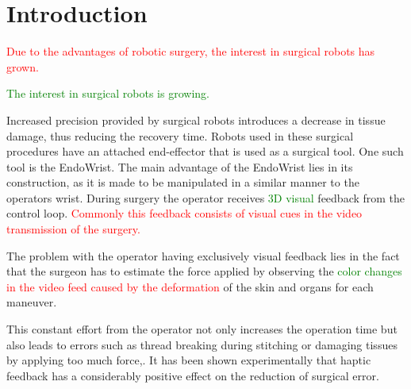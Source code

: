 \section{Introduction}\label{sec:introduction}
{}
\textcolor{red}{Due to the advantages of robotic surgery, the interest in surgical robots has grown\cite{forbes}.}

\textcolor{green}{
The interest in surgical robots is growing\cite{forbes}.
	}

Increased precision provided by surgical robots introduces a decrease in tissue damage, thus reducing the recovery time\cite{RIGSP}.
Robots used in these surgical procedures have an attached end-effector that is used as a surgical tool.
One such tool is the EndoWrist.
The main advantage of the EndoWrist lies in its construction, as it is made to be manipulated in a similar manner to the operators wrist.
During surgery the operator receives \textcolor{green}{3D visual} feedback from the control loop. \textcolor{red}{Commonly this feedback consists of visual cues in the video transmission of the surgery.}


The problem with the operator having exclusively visual feedback lies in the fact that the surgeon has to estimate the force applied by observing the \textcolor{green}{color changes}\textcolor{red}{ in the video feed caused by the deformation}  of the skin and organs for each maneuver.



This constant effort from the operator not only increases the operation time but also leads to errors such as thread breaking during stitching or damaging tissues by applying too much force,\cite{lee2015grip}. It has been shown experimentally that haptic feedback has a considerably positive effect on the reduction of surgical error\cite{EOFGFF}.

